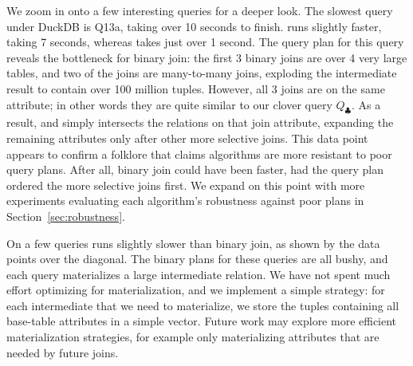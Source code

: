 We zoom in onto a few interesting queries for a deeper look.
The slowest query under DuckDB is Q13a, taking over 10 seconds to finish.
  \GJ runs slightly faster, taking 7 seconds, 
  whereas \FJ takes just over 1 second.
The query plan for this query reveals the bottleneck for binary join:
  the first 3 binary joins are over 4 very large tables, 
  and two of the joins are many-to-many joins, exploding the 
  intermediate result to contain over 100 million tuples.
However, all 3 joins are on the same attribute;
in other words they are quite  similar to our clover query $Q_\clubsuit$.
As a result, \GJ and \FJ simply intersects the relations 
  on that join attribute, 
  expanding the remaining attributes only after 
  other more selective joins.
This data point appears to confirm a folklore that claims
  \WCOJ algorithms are more resistant to poor query plans.
After all, binary join could have been faster, had the query plan 
  ordered the more selective joins first.
We expand on this point with more experiments evaluating 
  each algorithm's robustness against poor plans in Section~\ref{sec:robustness}.

On a few queries \FJ runs slightly slower than binary join, 
  as shown by the data points over the diagonal.
The binary plans for these queries are all bushy, 
  and each query materializes a large intermediate relation.
We have not spent much effort optimizing for materialization, 
  and we implement a simple strategy: for each intermediate 
  that we need to materialize, we store the tuples containing 
  all base-table attributes in a simple vector.
Future work may explore more efficient materialization strategies, 
  for example only materializing attributes that 
  are needed by future joins.


